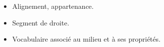 \begin{prerequis}    
    \begin{itemize}                
        \item[\emoji{red-heart}] Alignement, appartenance.
        \item[\emoji{red-heart}] Segment de droite.
        \item[\emoji{red-heart}] Vocabulaire associé au milieu et à ses propriétés.
    \end{itemize}
 \end{prerequis}